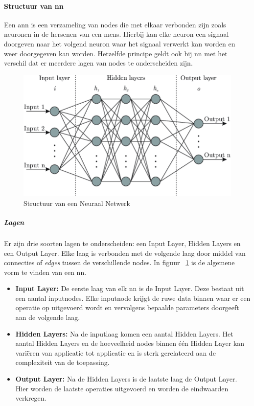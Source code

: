 		\paragraph{Structuur van \gls{nn}}
		Een \gls{ann} is een verzameling van nodes die met elkaar verbonden zijn zoals neuronen in de hersenen van een mens. Hierbij kan elke neuron een signaal doorgeven naar het volgend neuron waar het signaal verwerkt kan worden en weer doorgegeven kan worden. Hetzelfde principe geldt ook bij \gls{nn} met het verschil dat er meerdere lagen van nodes te onderscheiden zijn. 
	
		\begin{figure}
			\centering
			\includegraphics[width=140mm]{afbeeldingen/neuralNetwork2.PNG}
			\caption{Structuur van een Neuraal Netwerk}
			\label{fig:neuralNetworkStructuur}
		\end{figure}
		
			\subparagraph{Lagen}
			Er zijn drie soorten lagen te onderscheiden: een Input Layer, Hidden Layers en een Output Layer. Elke laag is verbonden met de volgende laag door middel van connecties of \textit{edges} tussen de verschillende nodes. In figuur ~\ref{fig:neuralNetworkStructuur} is de algemene vorm te vinden van een \gls{nn}.
		
				\begin{itemize}
					\item \textbf{Input Layer:} De eerste laag van elk \gls{nn} is de Input Layer. Deze bestaat uit een aantal inputnodes. Elke inputnode krijgt de ruwe data binnen waar er een operatie op uitgevoerd wordt en vervolgens bepaalde parameters doorgeeft aan de volgende laag. 
					\item \textbf{Hidden Layers:}  Na de inputlaag komen een aantal Hidden Layers. Het aantal Hidden Layers en de hoeveelheid nodes binnen \'e\'en Hidden Layer kan vari\"eren van applicatie tot applicatie en is sterk gerelateerd aan de complexiteit van de toepassing.
					\item \textbf{Output Layer:} Na de Hidden Layers is de laatste laag de Output Layer. Hier worden de laatste operaties uitgevoerd en worden de eindwaarden verkregen.
				\end{itemize}
			
